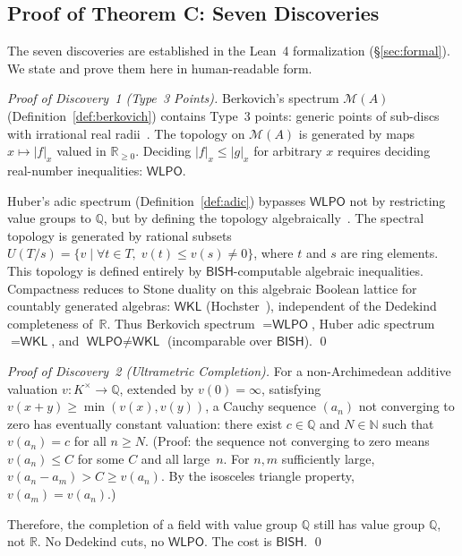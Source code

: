 \documentclass[11pt,a4paper]{article}
\theoremstyle{plain}
\theoremstyle{definition}
\newcommand{\BISH}{\textsf{BISH}}
\newcommand{\WKL}{\textsf{WKL}}
\newcommand{\WLPO}{\textsf{WLPO}}
\newcommand{\Q}{\mathbb{Q}}
\newcommand{\R}{\mathbb{R}}
\newcommand{\N}{\mathbb{N}}
\begin{document}
\subsection{Proof of Theorem C: Seven Discoveries}\label{sec:thmC}

The seven discoveries are established in the Lean~4 formalization (\S\ref{sec:formal}). We state and prove them here in human-readable form.

\begin{proof}[Proof of Discovery~1 (Type~3 Points)]
Berkovich's spectrum $\mathcal{M}(A)$ (Definition~\ref{def:berkovich}) contains Type~3 points: generic points of sub-discs with irrational real radii~\cite{berkovich90}. The topology on $\mathcal{M}(A)$ is generated by maps $x \mapsto |f|_x$ valued in $\R_{\geq 0}$. Deciding $|f|_x \leq |g|_x$ for arbitrary $x$ requires deciding real-number inequalities: $\WLPO$.

Huber's adic spectrum (Definition~\ref{def:adic}) bypasses $\WLPO$ not by restricting value groups to $\Q$, but by defining the topology algebraically~\cite{huber94}. The spectral topology is generated by rational subsets $U(T/s) = \{v \mid \forall t \in T,\; v(t) \leq v(s) \neq 0\}$, where $t$ and $s$ are ring elements. This topology is defined entirely by $\BISH$-computable algebraic inequalities. Compactness reduces to Stone duality on this algebraic Boolean lattice for countably generated algebras: $\WKL$ (Hochster~\cite{hochster69}), independent of the Dedekind completeness of~$\R$. Thus Berkovich spectrum $= \WLPO$, Huber adic spectrum $= \WKL$, and $\WLPO \neq \WKL$ (incomparable over $\BISH$). \qed
\end{proof}

\begin{proof}[Proof of Discovery~2 (Ultrametric Completion)]
For a non-Archimedean additive valuation $v: K^{\times} \to \Q$, extended by $v(0) = \infty$, satisfying $v(x+y) \geq \min(v(x), v(y))$, a Cauchy sequence $(a_n)$ not converging to zero has eventually constant valuation: there exist $c \in \Q$ and $N \in \N$ such that $v(a_n) = c$ for all $n \geq N$. (Proof: the sequence not converging to zero means $v(a_n) \leq C$ for some $C$ and all large~$n$. For $n, m$ sufficiently large, $v(a_n - a_m) > C \geq v(a_n)$. By the isosceles triangle property, $v(a_m) = v(a_n)$.)

Therefore, the completion of a field with value group $\Q$ still has value group $\Q$, not $\R$. No Dedekind cuts, no $\WLPO$. The cost is $\BISH$. \qed
\end{proof}
\end{document}
